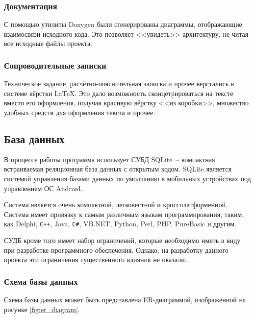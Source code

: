 \subsubsection{Документация}

С помощью утилиты Doxygen были сгенерированы диаграммы, отображающие
взаимосвязи исходного кода. Это позволяет <<увидеть>> архитектуру,
не читая все исходные файлы проекта.

\subsubsection{Сопроводительные записки}

Техническое задание, расчётно-пояснительная записка и прочее верстались
в системе вёрстки \LaTeX. Это дало возможность сконцетрироваться на
тексте вместо его оформления, получая красивую вёрстку <<из коробки>>, множество
удобных средств для оформления текста и прочее.

\subsection{База данных}

В процессе работы программа использует СУБД SQLite~-- компактная
встраиваемая реляционная база данных с открытым кодом. SQLite является системой
управления базами данных по умолчанию в мобильных устройствах под управлением ОС Android.

Система является очень компактной, легковестной и кроссплатформенной.
Система имеет привязку к самым различным
языкам программирования, таким, как Delphi, \verb|C++|, Java, \verb|C#|, VB.NET, Python, Perl, PHP, PureBasic и другим.

СУДБ кроме того имеет набор ограничений, которые необходимо иметь в виду при разработке программного
обеспечения. Однако, на разработку данного проекта эти ограничения существенного влияния не оказали.

\subsubsection{Схема базы данных}

Схема базы данных может быть представлена ER-диаграммой, изображенной на рисунке \ref{fig:er_diagram}.

